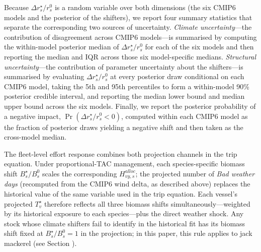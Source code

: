 \documentclass[
  11pt,
]{article}
\begin{document}
Because \(\Delta r_s^{\star}/r_s^{0}\) is a random variable over both dimensions (the six CMIP6 models and the posterior of the shifters), we report four summary statistics that separate the corresponding two sources of uncertainty. \emph{Climate uncertainty}---the contribution of disagreement across CMIP6 models---is summarised by computing the within-model posterior median of \(\Delta r_s^{\star}/r_s^{0}\) for each of the six models and then reporting the median and IQR across those six model-specific medians. \emph{Structural uncertainty}---the contribution of parameter uncertainty about the shifters---is summarised by evaluating \(\Delta r_s^{\star}/r_s^{0}\) at every posterior draw conditional on each CMIP6 model, taking the 5th and 95th percentiles to form a within-model 90\% posterior credible interval, and reporting the median lower bound and median upper bound across the six models. Finally, we report the posterior probability of a negative impact, \(\Pr(\Delta r_s^{\star}/r_s^{0} < 0)\), computed within each CMIP6 model as the fraction of posterior draws yielding a negative shift and then taken as the cross-model median.

The fleet-level effort response combines both projection channels in the trip equation. Under proportional-TAC management, each species-specific biomass shift \(B_s^{\star}/B_s^{0}\) scales the corresponding \(H^{alloc}_{vy,s}\); the projected number of \emph{Bad weather days} (recomputed from the CMIP6 wind delta, as described above) replaces the historical value of the same variable used in the trip equation. Each vessel's projected \(T_v^{\star}\) therefore reflects all three biomass shifts simultaneously---weighted by its historical exposure to each species---plus the direct weather shock. Any stock whose climate shifters fail to identify in the historical fit has its biomass shift fixed at \(B_s^{\star}/B_s^{0}=1\) in the projection; in this paper, this rule applies to jack mackerel (see Section \emph{}).
\end{document}
